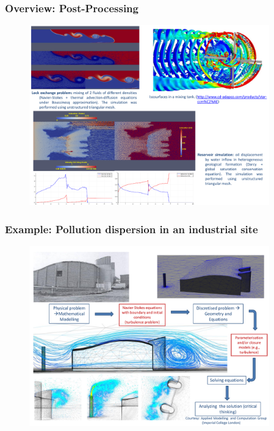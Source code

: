 \documentclass[10pt,compress]{beamer}
\begin{document}
\begin{frame}
 \frametitle{Overview: Post-Processing}

   \begin{figure}%
    \begin{center}
     \includegraphics[width=12.cm, height=7.8cm, clip]{./Figs/PostProcessingExamples.pdf}
    \end{center}
   \end{figure}    

\end{frame}

\begin{frame}
 \frametitle{Example: Pollution dispersion in an industrial site}

   \begin{figure}%
    \begin{center}
     \includegraphics[width=12.cm, height=7.8cm, clip]{./Figs/SpecificIndustrialEnvironmentalApplication.pdf}
    \end{center}
   \end{figure}    

\end{frame}
\end{document}
